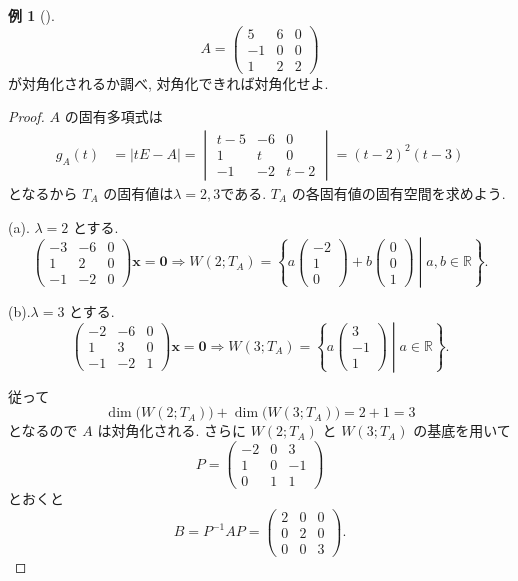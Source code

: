 \documentclass[dvipdfmx,a4paper,11pt]{article} %
\theoremstyle{definition}
\newtheorem{eg}[thm]{例}
\begin{document}
\begin{eg}
[{\cite[例題5.4.2]{M}}]
\[
A=
\begin{pmatrix}
5&6&0\\
-1&0&0\\
1&2&2
\end{pmatrix}
\]
が対角化されるか調べ, 対角化できれば対角化せよ.

\begin{proof}



\(A\) の固有多項式は
\[
\begin{aligned}
g_A(t)
&=\lvert tE-A\rvert
=
\begin{vmatrix}
t-5&-6&0\\
1&t&0\\
-1&-2&t-2
\end{vmatrix}=(t-2)^2(t-3)
\end{aligned}
\]
となるから \(T_A\) の固有値は\(\lambda=2,3\)である. \(T_A\) の各固有値の固有空間を求めよう.

(a). \(\lambda=2\) とする.
\[
\begin{pmatrix}
-3&-6&0\\
1&2&0\\
-1&-2&0
\end{pmatrix}
\bm{x}=\bm{0}
\Rightarrow
W(2;T_A)
=
\left\{
a
\begin{pmatrix}
-2\\
1\\
0
\end{pmatrix}
+
b
\begin{pmatrix}
0\\
0\\
1
\end{pmatrix}
\mathrel{}\middle|\mathrel{}
a,b\in\mathbb{R}
\right\}.
\]

(b).\(\lambda=3\) とする.
\[
\begin{pmatrix}
-2&-6&0\\
1&3&0\\
-1&-2&1
\end{pmatrix}
\bm{x}=\bm{0}
\Rightarrow
W(3;T_A)
=
\left\{
a
\begin{pmatrix}
3\\
-1\\
1
\end{pmatrix}
\mathrel{}\middle|\mathrel{}
a\in\mathbb{R}
\right\}.
\]

従って
\[
\dim\bigl(W(2;T_A)\bigr)
+
\dim\bigl(W(3;T_A)\bigr)
=2+1=3
\]
となるので \(A\) は対角化される. さらに \(W(2;T_A)\) と \(W(3;T_A)\) の基底を用いて
\[
P=
\begin{pmatrix}
-2&0&3\\
1&0&-1\\
0&1&1
\end{pmatrix}
\]
とおくと
\[
B=P^{-1}AP
=
\begin{pmatrix}
2&0&0\\
0&2&0\\
0&0&3
\end{pmatrix}.
\]
\end{proof}
\end{eg}
\end{document}
